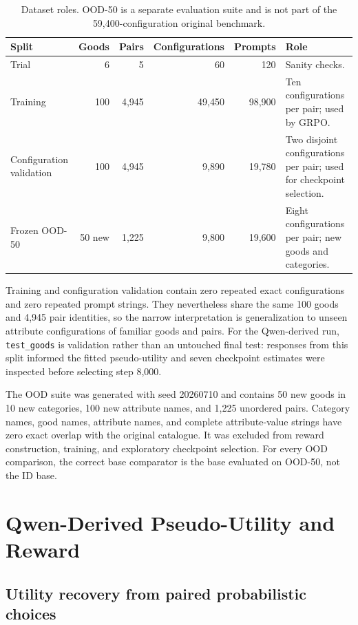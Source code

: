 \documentclass[11pt,letterpaper]{article}
\begin{document}
\begin{table}[htbp]
\centering
\small
\begin{tabular}{lrrrrp{}}
\toprule
Split & Goods & Pairs & Configurations & Prompts & Role \\
\midrule
Trial & 6 & 5 & 60 & 120 & Sanity checks. \\
Training & 100 & 4,945 & 49,450 & 98,900 & Ten configurations per pair; used by GRPO. \\
Configuration validation & 100 & 4,945 & 9,890 & 19,780 & Two disjoint configurations per pair; used for checkpoint selection. \\
Frozen OOD-50 & 50 new & 1,225 & 9,800 & 19,600 & Eight configurations per pair; new goods and categories. \\
\bottomrule
\end{tabular}
\caption{Dataset roles. OOD-50 is a separate evaluation suite and is not part
of the 59,400-configuration original benchmark.}
\label{tab:data}
\end{table}

Training and configuration validation contain zero repeated exact
configurations and zero repeated prompt strings. They nevertheless share the
same 100 goods and 4,945 pair identities, so the narrow interpretation is
generalization to unseen attribute configurations of familiar goods and pairs.
For the Qwen-derived run, \texttt{test\_goods} is validation rather than an
untouched final test: responses from this split informed the fitted
pseudo-utility and seven checkpoint estimates were inspected before selecting
step 8,000.

The OOD suite was generated with seed 20260710 and contains 50 new goods in 10
new categories, 100 new attribute names, and 1,225 unordered pairs. Category
names, good names, attribute names, and complete attribute-value strings have
zero exact overlap with the original catalogue. It was excluded from reward
construction, training, and exploratory checkpoint selection. For every OOD
comparison, the correct base comparator is the base evaluated on OOD-50, not
the ID base.

\section{Qwen-Derived Pseudo-Utility and Reward}

\subsection{Utility recovery from paired probabilistic choices}
\end{document}
